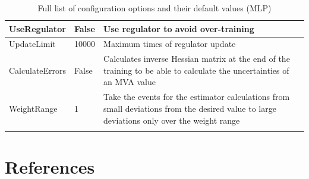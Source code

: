 \documentclass[11pt]{scrartcl}
\begin{document}
\begin{longtable}[c]{|p{4cm}|p{2.5cm}|p{7cm}|}
UseRegulator       & False      & Use regulator to avoid over-training                                                                                                                   \\ \hline
UpdateLimit        & 10000      & Maximum times of regulator update                                                                                                                      \\ \hline
CalculateErrors    & False      & Calculates inverse Hessian matrix at the end of the training to be able to calculate the uncertainties of an MVA value                                 \\ \hline
WeightRange        & 1          & Take the events for the estimator calculations from small deviations from the desired value to large deviations only over the weight range             \\ \hline

	\caption{Full list of configuration options and their default values (MLP)}
\end{longtable}

\newpage
\section{References}
\begingroup
\renewcommand{\section}[2]{}%

\endgroup

\newpage
\section{List of Figures}
\renewcommand{\listfigurename}{}
\vspace{-24pt}
\listoffigures


\newpage
\section{List of Tables}
\renewcommand{\listtablename}{}
\vspace{-24pt}
\listoftables
	
\end{document}
